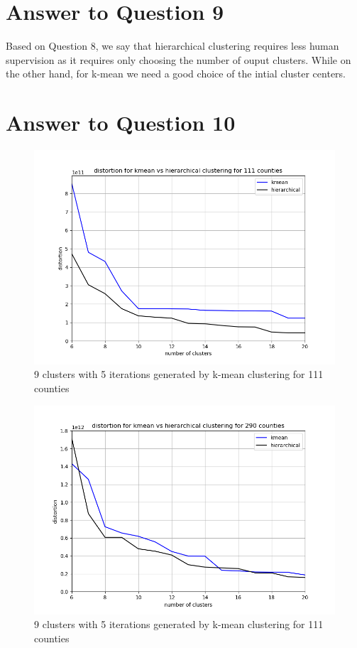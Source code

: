 \documentclass[a4paper]{article}
\begin{document}
\section*{Answer to Question 9}
Based on Question 8, we say that hierarchical clustering requires less human supervision as it requires only choosing the number of ouput clusters. While on the other hand, for k-mean we need a good choice of the intial cluster centers.

\section*{Answer to Question 10}
\FloatBarrier
\begin{figure}[h]
	\centering 
	\includegraphics[scale = 0.8, clip=True, trim=1cm 1cm 0cm 1cm]{Q10_distortion_111.png}
	\caption{9 clusters with 5 iterations generated by k-mean clustering for 111 counties}
\end{figure}
\FloatBarrier

\FloatBarrier
\begin{figure}[h]
	\centering 
	\includegraphics[scale = 0.8, clip=True, trim=1cm 1cm 0cm 1cm]{Q10_distortion_290.png}
	\caption{9 clusters with 5 iterations generated by k-mean clustering for 111 counties}
\end{figure}
\FloatBarrier
\end{document}
